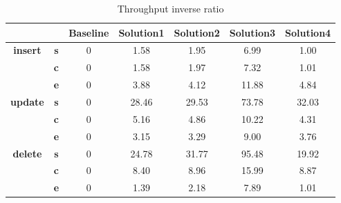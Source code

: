 \begin{table}[h]
\centering
\caption{Throughput inverse ratio}\label{t:}
\begin{tabular}{ccccccc}
\toprule
&&\textbf{Baseline} & \textbf{Solution1} & \textbf{Solution2} & \textbf{Solution3} & \textbf{Solution4}\\
\midrule
\multirow{3}{*}{\textbf{insert}} & \textbf{s} & 0 & 1.58 & 1.95 & 6.99 & 1.00\\
 & \textbf{c} & 0 & 1.58 & 1.97 & 7.32 & 1.01\\
 & \textbf{e} & 0 & 3.88 & 4.12 & 11.88 & 4.84\\
\midrule
\multirow{3}{*}{\textbf{update}} & \textbf{s} & 0 & 28.46 & 29.53 & 73.78 & 32.03\\
 & \textbf{c} & 0 & 5.16 & 4.86 & 10.22 & 4.31\\
 & \textbf{e} & 0 & 3.15 & 3.29 & 9.00 & 3.76\\
\midrule
\multirow{3}{*}{\textbf{delete}} & \textbf{s} & 0 & 24.78 & 31.77 & 95.48 & 19.92\\
 & \textbf{c} & 0 & 8.40 & 8.96 & 15.99 & 8.87\\
 & \textbf{e} & 0 & 1.39 & 2.18 & 7.89 & 1.01\\
\bottomrule
\end{tabular}
\end{table}






